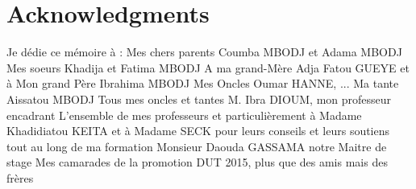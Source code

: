 %
%

\chapter*{Acknowledgments}
Je dédie ce mémoire à :
Mes chers parents Coumba MBODJ et Adama MBODJ
Mes soeurs Khadija et Fatima MBODJ
A ma grand-Mère Adja Fatou GUEYE et à Mon grand Père Ibrahima MBODJ
Mes Oncles Oumar HANNE, ...
Ma tante Aissatou MBODJ
Tous mes oncles et tantes
M. Ibra DIOUM, mon professeur encadrant
L’ensemble de mes professeurs et particulièrement à Madame Khadidiatou KEITA et à Madame SECK pour leurs conseils et leurs soutiens tout au long de ma formation
Monsieur Daouda GASSAMA notre Maitre de stage
Mes camarades de la promotion DUT 2015, plus que des amis mais des frères
\clearpage
